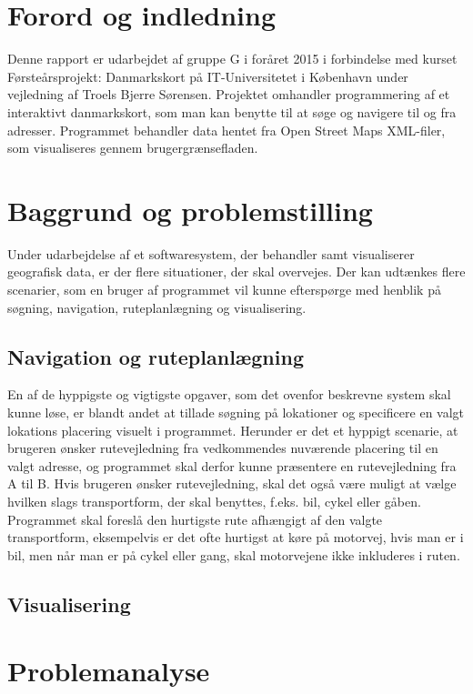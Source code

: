 \documentclass[a4paper]{article}
\begin{document}
\section{Forord og indledning}
Denne rapport er udarbejdet af gruppe G i foråret 2015 i forbindelse med kurset Førsteårsprojekt: Danmarkskort på IT-Universitetet i København under vejledning af Troels Bjerre Sørensen. Projektet omhandler programmering af et interaktivt danmarkskort, som man kan benytte til at søge og navigere til og fra adresser. Programmet behandler data hentet fra Open Street Maps XML-filer, som visualiseres gennem brugergrænsefladen. 

\section{Baggrund og problemstilling}
Under udarbejdelse af et softwaresystem, der behandler samt visualiserer geografisk data, er der flere situationer, der skal overvejes. Der kan udtænkes flere scenarier, som en bruger af programmet vil kunne efterspørge med henblik på søgning, navigation, ruteplanlægning og visualisering. 

\subsection{Navigation og ruteplanlægning}
En af de hyppigste og vigtigste opgaver, som det ovenfor beskrevne  system skal kunne løse, er blandt andet at tillade søgning på lokationer og specificere en valgt lokations placering  visuelt i programmet. Herunder er det et hyppigt scenarie, at brugeren ønsker rutevejledning fra vedkommendes nuværende placering til en valgt adresse, og programmet skal derfor kunne præsentere en rutevejledning fra A til B. Hvis brugeren ønsker rutevejledning, skal det også være muligt at vælge hvilken slags transportform, der skal benyttes, f.eks. bil, cykel eller gåben. 
Programmet skal foreslå den hurtigste rute afhængigt af den valgte transportform, eksempelvis er det ofte hurtigst at køre på motorvej, hvis man er i bil, men når man er på cykel eller gang, skal motorvejene ikke inkluderes i ruten.

\subsection{Visualisering}


\section{Problemanalyse}
\end{document}

